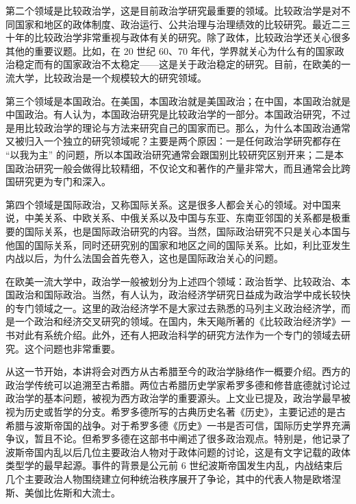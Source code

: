 第二个领域是比较政治学，这是目前政治学研究最重要的领域。比较政治学是对不同国家和地区的政体制度、政治运行、公共治理与治理绩效的比较研究。最近二三十年的比较政治学非常重视与政体有关的研究。除了政体，比较政治学还关心很多其他的重要议题。比如，在 20 世纪 60、70 年代，学界就关心为什么有的国家政治稳定而有的国家政治不太稳定——这是关于政治稳定的研究。目前，在欧美的一流大学，比较政治是一个规模较大的研究领域。

第三个领域是本国政治。在美国，本国政治就是美国政治；在中国，本国政治就是中国政治。有人认为，本国政治研究是比较政治学的一部分。本国政治研究，不过是用比较政治学的理论与方法来研究自己的国家而已。那么，为什么本国政治通常又被归入一个独立的研究领域呢？主要是两个原因：一是任何政治学研究都存在 “以我为主” 的问题，所以本国政治研究通常会跟国别比较研究区别开来；二是本国政治研究一般会做得比较精细，不仅论文和著作的产量非常大，而且通常会比跨国研究更为专门和深入。

第四个领域是国际政治，又称国际关系。这是很多人都会关心的领域。对中国来说，中美关系、中欧关系、中俄关系以及中国与东亚、东南亚邻国的关系都是极重要的国际关系，也是国际政治研究的内容。当然，国际政治研究不只是关心本国与他国的国际关系，同时还研究别的国家和地区之间的国际关系。比如，利比亚发生内战以后，为什么法国会首先卷入，这也是国际政治关心的问题。

在欧美一流大学中，政治学一般被划分为上述四个领域：政治哲学、比较政治、本国政治和国际政治。当然，有人认为，政治经济学研究日益成为政治学中成长较快的专门领域之一。这里的政治经济学不是大家过去熟悉的马列主义政治经济学，而是一个政治和经济交叉研究的领域。在国内，朱天飚所著的《比较政治经济学》一书对此有系统介绍。此外，还有人把政治科学的研究方法作为一个专门的领域去研究。这个问题也非常重要。


从这一节开始，本讲将会对西方从古希腊至今的政治学脉络作一概要介绍。西方的政治学传统可以追溯至古希腊。两位古希腊历史学家希罗多德和修昔底德就讨论过政治学的基本问题，被视为西方政治学的重要源头。上文业已提及，政治学最早被视为历史或哲学的分支。希罗多德所写的古典历史名著《历史》，主要记述的是古希腊与波斯帝国的战争。对于希罗多德《历史》一书是否可信，国际历史学界充满争议，暂且不论。但希罗多德在这部书中阐述了很多政治观点。特别是，他记录了波斯帝国内乱以后几位主要政治人物对于政体问题的讨论，这是有文字记载的政体类型学的最早起源。事件的背景是公元前 6 世纪波斯帝国发生内乱，内战结束后几个主要政治人物围绕建立何种统治秩序展开了争论，其中的代表人物是欧塔涅斯、美伽比佐斯和大流士。


